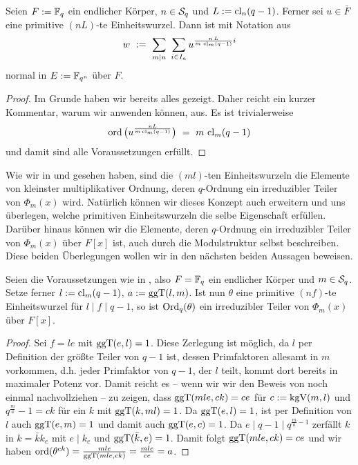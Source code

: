 \begin{satz}
  Seien $F := \F_q$ ein endlicher Körper, $n\in \S_q$ und $L:=\cl_n(q-1)$.
  Ferner sei $u \in \bar F$ eine primitive $(nL)$-te Einheitswurzel. Dann ist
  mit Notation aus 
  \[ w \speq{:=} \sum_{m\mid n} \ \sum_{i\in I_a}
    u^{\frac{n\, L}{m\, \cl_m(q-1)}i}\]
  normal in $E := \F_{q^n}$ über $F$.
\end{satz}
\begin{proof}
  Im Grunde haben wir bereits alles gezeigt. Daher reicht ein kurzer Kommentar,
  warum wir  anwenden können, aus. Es ist
  trivialerweise 
  \[ \ord\big( u^{\frac{nL}{m\cl_m(q-1)}} \big) \speq=
    m\, \cl_m(q-1)\]
  und damit sind alle Voraussetzungen erfüllt.
\end{proof}

\begin{bemerkung}
  Wie wir in  und 
  gesehen haben, sind die $(ml)$-ten Einheitswurzeln die Elemente von kleinster
  multiplikativer Ordnung, deren $q$-Ordnung ein irreduzibler Teiler von
  $\Phi_m(x)$ wird. Natürlich können wir dieses Konzept auch erweitern und uns
  überlegen, welche primitiven Einheitswurzeln die selbe Eigenschaft erfüllen.
  Darüber hinaus können wir die Elemente, deren $q$-Ordnung ein irreduzibler
  Teiler von $\Phi_m(x)$ über $F[x]$ ist, auch durch die Modulstruktur selbst
  beschreiben.
  Diese beiden Überlegungen wollen wir in den nächsten beiden Aussagen beweisen.
\end{bemerkung}

\begin{lemma}
  \label{lemma:hoehere_wurzeln_auch_erzeuger}
  Seien die Voraussetzungen wie in , also
  $F = \F_q$ ein endlicher Körper und $m\in \S_q$. Setze ferner 
  $l := \cl_m(q-1)$, $a := \ggT(l,m)$. 
  Ist nun $\theta$ eine primitive $(nf)$-te Einheitswurzel für 
  $l \mid f \mid q-1$, so ist $\Ord_q(\theta)$ ein irreduzibler Teiler
  von $\Phi_m(x)$ über $F[x]$.
\end{lemma}
\begin{proof}
  Sei $f = le$ mit $\ggT(e,l) = 1$. Diese Zerlegung ist möglich, da
  $l$ per Definition der größte Teiler von $q-1$ ist, dessen Primfaktoren
  allesamt in $m$ vorkommen, d.h. jeder Primfaktor von $q-1$, der $l$ teilt,
  kommt dort bereits in maximaler Potenz vor.
  Damit reicht es -- wenn wir wir den Beweis von
   noch einmal nachvollziehen -- zu zeigen,
  dass $\ggT(mle, ck) = ce$ für $c := \kgV(m,l)$ und 
  $q^{\frac m a} -1 = ck$ für ein $k$ mit $\ggT(k,ml) = 1$. Da $\ggT(e,l) = 1$,
  ist per Definition von $l$ auch $\ggT(e,m) = 1$ und damit auch
  $\ggT(e,c) = 1$. Da $e \mid q-1\mid q^{\frac m a -1}$ zerfällt $k$ 
  in $k = \bar k k_e$ mit $e \mid k_e$ und $\ggT(\bar k,e) = 1$. Damit
  folgt $\ggT(mle, ck) = ce$ und wir haben
  $\ord(\theta^{ck}) = \frac{mle}{\ggT(mle,ck)} = \frac{mle}{ce} = a$.
\end{proof}

